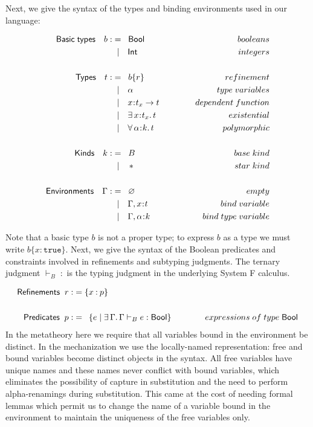 \documentclass[11pt]{article}
\newcommand{\al}{\alpha}
\newcommand{\bind}{\hspace{0.05em}{:}\hspace{0.05em}} %
\newcommand{\col}{\mathbin{:}}       %
\newcommand{\true}{\mathtt{true}}
\begin{document}
Next, we give the syntax of the types and binding environments used in our language:

\begin{align*}
{\sf Basic\; types} \quad b :&=\;\;{\sf Bool}{\kern 5em}&booleans\\
                   &\;\;|\quad {\sf Int} &integers \\ \\
{\sf Types} \quad t :&=\;\; b\{r\} & refinement \\
                   &\;\;|\quad \al &type\; variables \\
                   &\;\;|\quad x\bind t_x \rightarrow t 
                   &dependent\; function\\
                   &\;\;|\quad \exists\, x\bind t_x.\, t 
                   &existential\\ 
                   &\;\;|\quad \forall\, \al\bind k.\, t
                   &polymorphic\\ \\
{\sf Kinds} \quad k :&= \;\; B &base\; kind \\
                   &\;\;|\quad\, * &star\; kind \\ \\
{\sf Environments} \quad \Gamma :&=\;\; \varnothing
                   {\kern 5em}& empty \\
                   &\;\;|\quad \Gamma, x\bind t & bind\;variable\\
                   &\;\;|\quad \Gamma, \al\bind k & bind\;type\;variable\\
\end{align*}

Note that a basic type $b$ is not a proper type; to express $b$ as a type we must write $b\{x\col\true\}$. Next, we give the syntax of the Boolean predicates and constraints involved in refinements and subtyping judgments. The ternary judgment $\vdash_B \; :$ is the typing judgment in the underlying System F calculus.

\begin{align*}
{\sf Refinements} \;\; r :&= \{x\col p\}  \\ \\
{\sf Predicates} \;\; p :&=\;\: \{ e \;|\; \exists\, \Gamma.\, 
                   \Gamma \vdash_B e : {\sf Bool}\}
                   {\kern 3 em}& expressions\; of\; type\; {\sf Bool} 
\end{align*}
In the metatheory here we require that all variables bound in the environment be distinct. In the mechanization we use the locally-named representation: free and bound variables become distinct objects in the syntax. All free variables have unique names and these names never conflict with bound variables, which eliminates the possibility of capture in substitution and the need to perform alpha-renamings during substitution. This came at the cost of needing formal lemmas which permit us to change the name of a variable bound in the environment to maintain the uniqueness of the free variables only.
\end{document}
